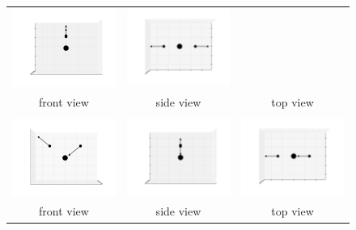 \documentclass[11pt]{article}
\begin{document}
\begin{figure}[htp]
\begin{tabular}{|ccc|}
    \includegraphics[width=5.5cm,clip=true,trim=3cm 2cm 3cm 2cm]{images/0-90_7.pdf}&
    \includegraphics[width=5.5cm,clip=true,trim=3cm 2cm 3cm 2cm]{images/90-0_7.pdf}\\front view&side view&top view\\\hline&&\\
    \includegraphics[width=5.5cm,clip=true,trim=3cm 2cm 3cm 2cm]{images/0-0_8.pdf}&
    \includegraphics[width=5.5cm,clip=true,trim=3cm 2cm 3cm 2cm]{images/0-90_8.pdf}&
    \includegraphics[width=5.5cm,clip=true,trim=3cm 2cm 3cm 2cm]{images/90-0_8.pdf}\\front view&side view&top view\\\hline
    \end{tabular}
\end{figure}
\end{document}
